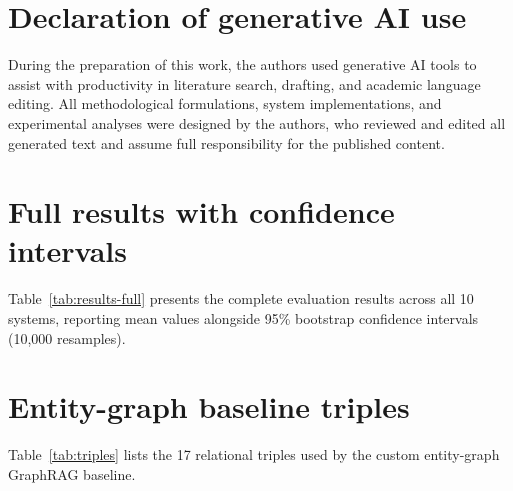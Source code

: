\documentclass[preprint,10pt]{elsarticle}
\begin{document}
\section*{Declaration of generative AI use}
During the preparation of this work, the authors used generative AI tools to assist with productivity in literature search, drafting, and academic language editing. All methodological formulations, system implementations, and experimental analyses were designed by the authors, who reviewed and edited all generated text and assume full responsibility for the published content.

\appendix
\section{Full results with confidence intervals}
\label{app:full-results}
Table~\ref{tab:results-full} presents the complete evaluation results across all 10 systems, reporting mean values alongside 95\% bootstrap confidence intervals (10,000 resamples).

\begin{table}[!htbp]
\centering
\caption{Complete evaluation results across all 10 systems on \nVerified{} verified benchmark questions, reporting mean [95\% bootstrap confidence intervals].}
\label{tab:results-full}
\scriptsize
\setlength{\tabcolsep}{2pt}
\resizebox{\textwidth}{!}{%
}
\end{table}

\section{Entity-graph baseline triples}
\label{app:triples}
Table~\ref{tab:triples} lists the 17 relational triples used by the custom entity-graph GraphRAG baseline.
\end{document}
